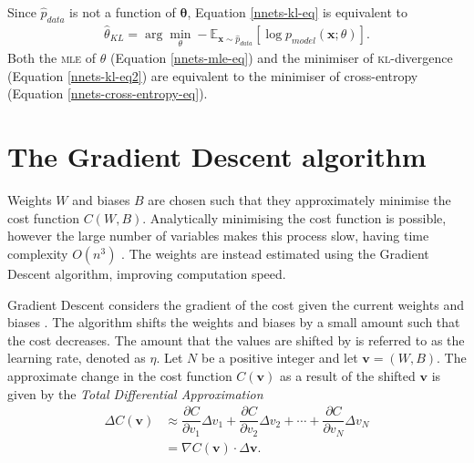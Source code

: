 Since $\hat{p}_{data}$ is not a function of $\mathbf{\theta}$, Equation \eqref{nnets-kl-eq} is equivalent to 
\begin{align}\label{nnets-kl-eq2}
	\hat\theta_{KL} = \arg\min_\theta-\mathbb{E}_{\mathbf{x}\sim\hat{p}_{data}}\left[\log p_{model}(\mathbf{x};\theta)\right].
\end{align}
Both the \textsc{mle} of $\theta$ (Equation \eqref{nnets-mle-eq}) and the minimiser of \textsc{kl}-divergence (Equation \eqref{nnets-kl-eq2}) are equivalent to the minimiser of cross-entropy (Equation \eqref{nnets-cross-entropy-eq}). 






\section{The Gradient Descent algorithm}\label{nnets-graddesc}

Weights $W$ and biases $B$ are chosen such that they approximately minimise the cost function $C(W,B)$. Analytically minimising the cost function is possible, however the large number of variables makes this process slow, having time complexity $O(n^3)$ \cite{Marquardt1963}. The weights are instead estimated using the Gradient Descent algorithm, improving computation speed.

Gradient Descent considers the gradient of the cost given the current weights and biases \cite{Nielson2015}. The algorithm shifts the weights and biases by a small amount such that the cost decreases. The amount that the values are shifted by is referred to as the learning rate, denoted as $\eta$. Let $N$ be a positive integer and let $\mathbf{v} = (W,B)$. The approximate change in the cost function $C(\mathbf{v})$ as a result of the shifted $\mathbf{v}$ is given by the \textit{Total Differential Approximation}
\begin{align}
	\Delta C(\mathbf{v}) & \approx \dfrac{\partial C}{\partial v_1}\Delta v_1 + \dfrac{\partial C}{\partial v_2}\Delta v_2 + \cdots + \dfrac{\partial C}{\partial v_N}\Delta v_N\\
	& = \nabla C(\mathbf{v})\cdot \Delta \mathbf{v}.\label{nnets-total-diff-eq}
\end{align}


